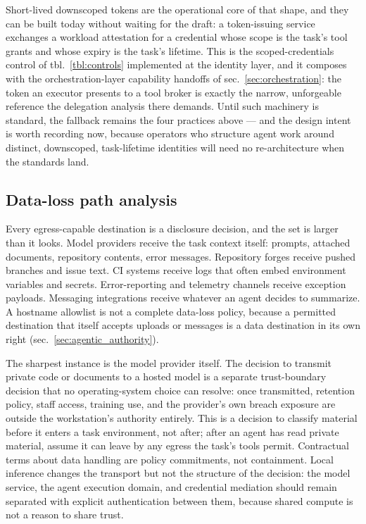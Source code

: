 \documentclass[
  english,
  9pt,
]{extarticle}
\begin{document}
Short-lived downscoped tokens are the operational core of that shape,
and they can be built today without waiting for the draft: a
token-issuing service exchanges a workload attestation for a credential
whose scope is the task's tool grants and whose expiry is the task's
lifetime. This is the scoped-credentials control of
tbl.~\ref{tbl:controls} implemented at the identity layer, and it
composes with the orchestration-layer capability handoffs of
sec.~\ref{sec:orchestration}: the token an executor presents to a tool
broker is exactly the narrow, unforgeable reference the delegation
analysis there demands. Until such machinery is standard, the fallback
remains the four practices above --- and the design intent is worth
recording now, because operators who structure agent work around
distinct, downscoped, task-lifetime identities will need no
re-architecture when the standards land.

\subsection{Data-loss path analysis}\label{data-loss-path-analysis}

Every egress-capable destination is a disclosure decision, and the set
is larger than it looks. Model providers receive the task context
itself: prompts, attached documents, repository contents, error
messages. Repository forges receive pushed branches and issue text. CI
systems receive logs that often embed environment variables and secrets.
Error-reporting and telemetry channels receive exception payloads.
Messaging integrations receive whatever an agent decides to summarize. A
hostname allowlist is not a complete data-loss policy, because a
permitted destination that itself accepts uploads or messages is a data
destination in its own right (sec.~\ref{sec:agentic_authority}).

The sharpest instance is the model provider itself. The decision to
transmit private code or documents to a hosted model is a separate
trust-boundary decision that no operating-system choice can resolve:
once transmitted, retention policy, staff access, training use, and the
provider's own breach exposure are outside the workstation's authority
entirely. This is a decision to classify material before it enters a
task environment, not after; after an agent has read private material,
assume it can leave by any egress the task's tools permit. Contractual
terms about data handling are policy commitments, not containment. Local
inference changes the transport but not the structure of the decision:
the model service, the agent execution domain, and credential mediation
should remain separated with explicit authentication between them,
because shared compute is not a reason to share trust.
\end{document}
